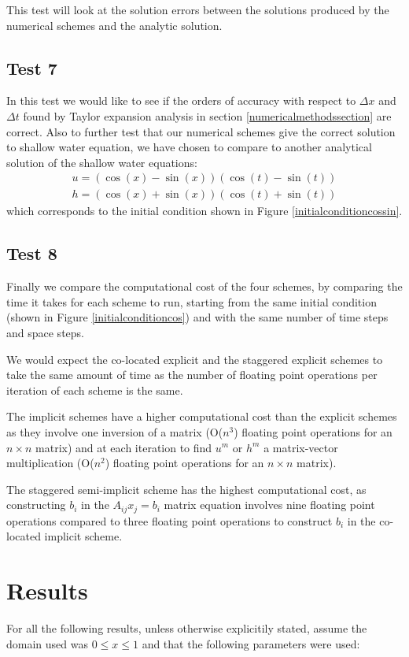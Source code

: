 \documentclass[a4paper,12pt, notitlepage]{article}
\begin{document}
This test will look at the solution errors between the solutions produced by the numerical schemes and the analytic solution. 

\subsection{Test 7}

In this test we would like to see if the orders of accuracy with respect to $\Delta x$ and $\Delta t$ found by Taylor expansion analysis in section \ref{numericalmethodssection} are correct. 
Also to further test that our numerical schemes give the correct solution to shallow water equation, we have chosen to compare to another analytical solution of the shallow water equations: 
\begin{eqnarray}
u = (\cos(x) - \sin(x))(\cos(t) - \sin(t))\\
h = (\cos(x) + \sin(x))(\cos(t) + \sin(t))
\end{eqnarray}
which corresponds to the initial condition shown in Figure \ref{initialconditioncossin}.

\subsection{Test 8}
Finally we compare the computational cost of the four schemes, by comparing the time it takes for each scheme to run, starting from the same initial condition (shown in Figure \ref{initialconditioncos}) and with the same number of time steps and space steps.

We would expect the co-located explicit and the staggered explicit schemes to take the same amount of time as the number of floating point operations per iteration of each scheme is the same. 

The implicit schemes have a higher computational cost than the explicit schemes as they involve one inversion of a matrix (O($n^{3}$) floating point operations for an $n \times n$ matrix) and at each iteration to find $u^{m}$ or $h^{m}$ a matrix-vector multiplication (O($n^{2}$) floating point operations for an $n \times n$ matrix). 

The staggered semi-implicit scheme has the highest computational cost, as constructing $b_{i}$ in the $A_{ij}x_{j} = b_{i}$ matrix equation involves nine floating point operations compared to three floating point operations to construct $b_{i}$ in the co-located implicit scheme.

\section{Results}\label{results section}
For all the following results, unless otherwise explicitily stated, assume the domain used was $0 \leq x \leq 1$ and that the following parameters were used:
\end{document}
